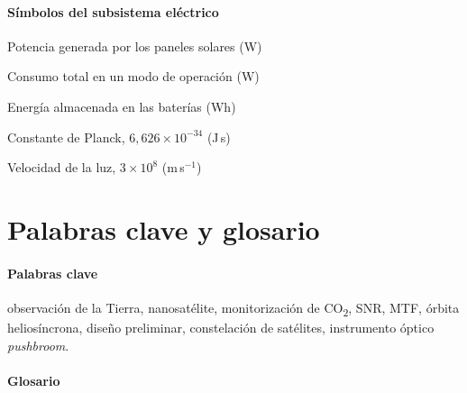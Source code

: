 \subsubsection*{Símbolos del subsistema eléctrico}
\begin{description}[leftmargin=4.5cm, labelwidth=4cm, labelsep=0.5cm]
  \item[$P_\text{gen}$]     Potencia generada por los paneles solares (W)
  \item[$P_\text{modo}$]    Consumo total en un modo de operación (W)
  \item[$E_\text{bat}$]     Energía almacenada en las baterías (Wh)
  \item[$h_\text{P}$]       Constante de Planck, $6{,}626\times10^{-34}$ (J\,s)
  \item[$c$]                Velocidad de la luz, $3\times10^{8}$ (m\,s$^{-1}$)
\end{description}
\clearpage

\chapter*{Palabras clave y glosario}
\thispagestyle{empty}

\subsubsection*{Palabras clave}
observación de la Tierra, nanosatélite, monitorización de CO\textsubscript{2}, SNR, MTF, órbita heliosíncrona, diseño preliminar, constelación de satélites, instrumento óptico \textit{pushbroom}.

\vspace{1em}
\subsubsection*{Glosario}

